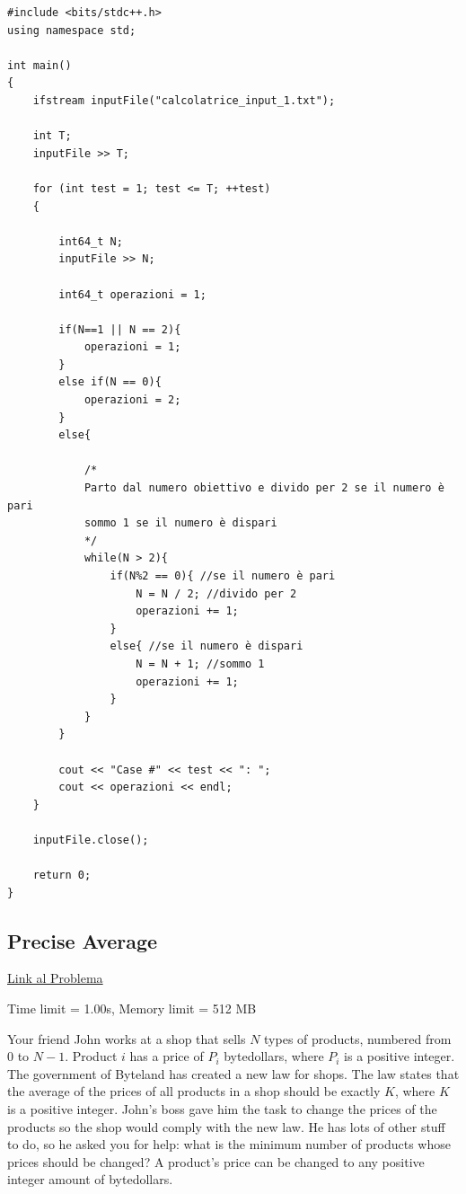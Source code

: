 \begin{lstlisting}
#include <bits/stdc++.h>
using namespace std;

int main()
{
	ifstream inputFile("calcolatrice_input_1.txt");
	
	int T;
	inputFile >> T;
	
	for (int test = 1; test <= T; ++test)
	{     
		
		int64_t N;
		inputFile >> N;
		
		int64_t operazioni = 1;
		
		if(N==1 || N == 2){
			operazioni = 1;
		}
		else if(N == 0){
			operazioni = 2;
		}
		else{
			
			/* 
			Parto dal numero obiettivo e divido per 2 se il numero è pari
			sommo 1 se il numero è dispari
			*/
			while(N > 2){
				if(N%2 == 0){ //se il numero è pari
					N = N / 2; //divido per 2
					operazioni += 1;
				}
				else{ //se il numero è dispari
					N = N + 1; //sommo 1
					operazioni += 1;
				}
			}
		}
		
		cout << "Case #" << test << ": ";
		cout << operazioni << endl;
	}
	
	inputFile.close();
	
	return 0;
}

\end{lstlisting}


\subsection{Precise Average}

\href{https://training.olinfo.it/task/ois_avg}{Link al Problema}
	\smallskip

\noindent Time limit = 1.00s, Memory limit = 512 MB

\bigskip

Your friend John works at a shop that sells $N$ types of products, numbered from $0$ to $N −1$. Product $i$ has a price of $P_i$ bytedollars, where $P_i$ is a positive integer.
\medskip
The government of Byteland has created a new law for shops. The law states that the average of the prices of all products in a shop should be exactly $K$, where $K$ is a positive integer. John’s boss gave him the task to change the prices of the products so the shop would comply with the new law.
\medskip
He has lots of other stuff to do, so he asked you for help: what is the minimum number of products whose prices should be changed? A product’s price can be changed to any positive integer amount of bytedollars.

